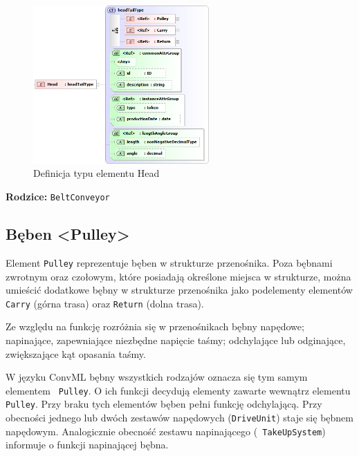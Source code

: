 \documentclass[12pt,a4paper]{article}
\begin{document}
\begin{figure}[H]
  \centering
  \includegraphics[width=0.6\textwidth]{png/liquid/Head}
  \caption{Definicja typu elementu Head}
  \label{fig:head-xsd}
\end{figure}

\noindent\textbf{Rodzice:} \texttt{BeltConveyor}


\subsection{Bęben <Pulley>}
Element {\tt Pulley} reprezentuje bęben w strukturze przenośnika.  Poza bębnami
zwrotnym oraz czołowym, które posiadają określone miejsca w strukturze, można
umieścić dodatkowe bębny w strukturze przenośnika jako podelementy elementów
{\tt Carry} (górna trasa) oraz {\tt Return} (dolna trasa).

Ze względu na funkcję rozróżnia się w przenośnikach bębny napędowe; napinające,
zapewniające niezbędne napięcie taśmy; odchylające lub odginające, zwiększające
kąt opasania taśmy.

W języku ConvML bębny wszystkich rodzajów oznacza się tym samym elementem {\tt
  Pulley}.  O ich funkcji decydują elementy zawarte wewnątrz elementu {\tt
  Pulley}. Przy braku tych elementów bęben pełni funkcję odchylającą.  Przy
obecności jednego lub dwóch zestawów napędowych ({\tt DriveUnit}) staje się
bębnem napędowym.  Analogicznie obecność zestawu napinającego ({\tt
  TakeUpSystem}) informuje o funkcji napinającej bębna.
\end{document}
